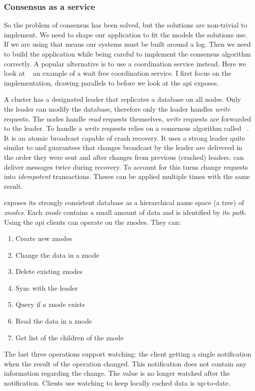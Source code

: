 \subsubsection*{Consensus as a service}
So the problem of consensus has been solved, but the solutions are non-trivial to implement. We need to shape our application to fit the models the solutions use. If we are using \raft{} that means our systems must be built around a log. Then we need to build the application while being careful to implement the consensus algorithm correctly. A popular alternative is to use a coordination service instead. Here we look at \zookeeper{}~\cite{zookeeper} an example of a wait free coordination service. I first focus on the implementation, drawing parallels to \raft{} before we look at the \ac{api} \zookeeper{} exposes.

A \zookeeper{} cluster has a designated leader that replicates a database on all nodes. Only the leader can modify the database, therefore only the leader handles \textit{write} requests. The nodes handle \textit{read} requests themselves, \textit{write} requests are forwarded to the leader. To handle a \textit{write} requests \zookeeper{} relies on a consensus algorithm called \zab{}~\cite{zab}. It is an atomic broadcast capable of crash recovery. It uses a strong leader quite similar to \raft{} and guarantees that changes broadcast by the leader are delivered in the order they were sent and after changes from previous (crashed) leaders. \zab{} can deliver messages twice during recovery. To account for this \zookeeper{} turns change requests into \textit{idempotent} transactions. Theses can be applied multiple times with the same result.

\zookeeper{} exposes its strongly consistent database as a hierarchical name space (a tree) of \textsl{znodes}. Each \textsl{znode} contains a small amount of data and is identified by its \textsl{path}. Using the \ac{api} clients can operate on the znodes. They can: 
%
\begin{multicols}{2}
\begin{enumerate}
	\item Create new znodes
	\item Change the data in a znode
	\item Delete existing znodes
	\item Sync with the leader
	\item Query if a znode exists
	\item Read the data in a znode
	\item Get list of the children of the znode
\end{enumerate}
\end{multicols}
%
The last three operations support watching: the client getting a single notification when the result of the operation changed. This notification does not contain any information regarding the change. The value is no longer watched after the notification. Clients use watching to keep locally cached data is up-to-date. 

